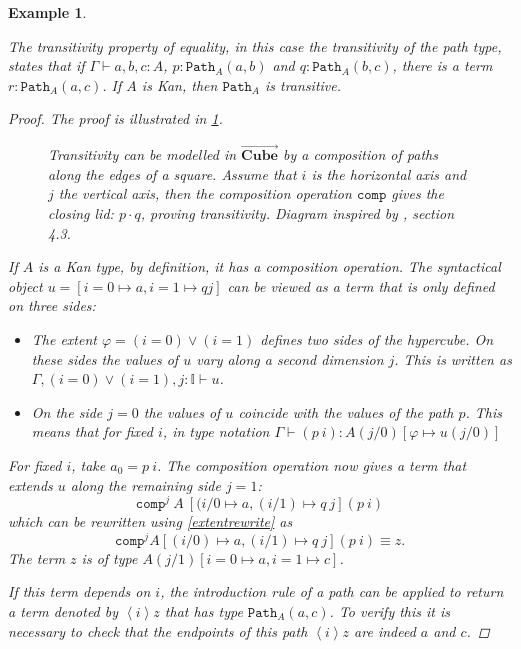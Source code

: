 \documentclass[12pt,a4paper,twoside,xetex]{book} %
\newcommand{\keyword}[1]{\emph{#1}\index{#1}}
\newtheorem{example}[theorem]{Example}
\newcommand{\psh}[1]{\overrightarrow{#1}}
\newcommand{\op}[1]{\mathtt{#1}}
\newcommand{\cube}[0]{\textbf{Cube}}
\newcommand{\pa}[3]{\op{Path}_{#1}\left(#2, #3\right)}
\begin{document}
\begin{example}\label{pathtransitivity}

The \keyword{transitivity} property of equality, in this case the transitivity of the path type, 
states that if $\Gamma \vdash a,b,c : A$, $p: \op{Path}_A(a,b)$ and $q: 
\op{Path}_A(b,c)$, there is a term $r : \op{Path}_A(a,c)$. If $A$ is Kan, then 
$\op{Path}_A$ is transitive.	

\begin{proof}
The proof is illustrated in \cref{transdiag}.

\begin{figure}\label{transdiag}

\caption{Transitivity can be modelled in $\psh{\cube}$ by a  composition 
of paths along the edges of a square. Assume that $i$ is the horizontal axis and   $j$ the vertical axis, then the composition operation $\texttt{comp}$ gives the closing lid: $p \cdot q$, proving transitivity. Diagram inspired by \cite{Cohen2016}, 
section 4.3.}
\end{figure}

If $A$ is a Kan type, by definition, it has a composition operation. The 
syntactical object $u = [i=0 \mapsto a, i=1 \mapsto q j]$ can be viewed as a 
term that is only defined on three sides:

\begin{itemize}
\item The extent $\varphi = (i=0) \vee (i=1)$ defines two sides of the 
hypercube. On these sides the values of $u$ vary along a second dimension $j$. 
This is written as $\Gamma, (i=0)\vee (i=1), j : \mathbb{I} \vdash u$.
\item On the side $j=0$ the values of $u$ coincide with the values of the path 
$p$. This means that for fixed $i$, in type notation $\Gamma \vdash (p \  i) : 
A(j/0)[\varphi \mapsto u(j/0)]$

\end{itemize}

For fixed $i$, take $a_0 = p \  i$. The composition operation now gives a 
term that extends $u$ along the remaining side $j=1$: $$\op{comp}^j\ A\ [(i/0 
\mapsto a, (i/1) \mapsto q\ j] (p\ i)$$ which can be rewritten using  
\cref{extentrewrite} as $$\op{comp}^j A [(i/0) \mapsto a, (i/1) \mapsto q \ j] 
(p \  i) \equiv z.$$ The term $z$ is of type $A(j/1)[i=0 \mapsto a, i=1 \mapsto 
c]$.

If this term depends on $i$, the introduction rule of a 
path can be applied to return a term denoted by $\left< i \right> z$ that has 
type $\pa{A}{a}{c}$. To verify this it is necessary to check that the endpoints 
of this path $\left< i \right> z$ are indeed $a$ and $c$.


\end{proof}
\end{example}
\end{document}
